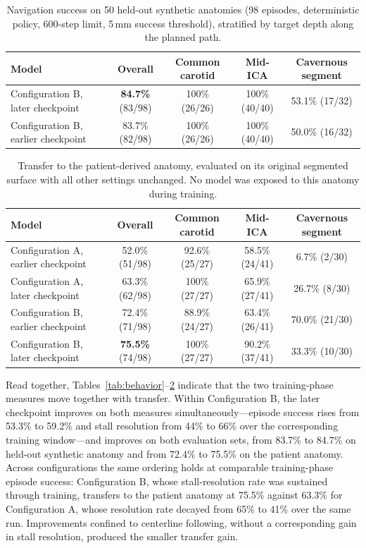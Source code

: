 \begin{table}[ht]
\caption{Navigation success on 50 held-out synthetic anatomies (98 episodes, deterministic
policy, 600-step limit, 5\,mm success threshold), stratified by target depth along the planned
path.}
\label{tab:synthetic}
\begin{center}
\begin{tabular}{lcccc}
\toprule
Model & Overall & Common carotid & Mid-ICA & Cavernous segment \\
\midrule
Configuration B, later checkpoint   & \textbf{84.7\%} (83/98) & 100\% (26/26) & 100\% (40/40) & 53.1\% (17/32) \\
Configuration B, earlier checkpoint & 83.7\% (82/98)          & 100\% (26/26) & 100\% (40/40) & 50.0\% (16/32) \\
\bottomrule
\end{tabular}
\end{center}
\end{table}

\begin{table}[ht]
\caption{Transfer to the patient-derived anatomy, evaluated on its original segmented surface
with all other settings unchanged. No model was exposed to this anatomy during training.}
\label{tab:patient}
\begin{center}
\begin{tabular}{lcccc}
\toprule
Model & Overall & Common carotid & Mid-ICA & Cavernous segment \\
\midrule
Configuration A, earlier checkpoint & 52.0\% (51/98)          & 92.6\% (25/27) & 58.5\% (24/41) & \phantom{0}6.7\% (2/30) \\
Configuration A, later checkpoint   & 63.3\% (62/98)          & 100\% (27/27)  & 65.9\% (27/41) & 26.7\% (8/30) \\
Configuration B, earlier checkpoint & 72.4\% (71/98)          & 88.9\% (24/27) & 63.4\% (26/41) & 70.0\% (21/30) \\
Configuration B, later checkpoint   & \textbf{75.5\%} (74/98) & 100\% (27/27)  & 90.2\% (37/41) & 33.3\% (10/30) \\
\bottomrule
\end{tabular}
\end{center}
\end{table}

Read together, Tables~\ref{tab:behavior}--\ref{tab:patient} indicate that the two training-phase
measures move together with transfer. Within Configuration B, the later checkpoint improves on
both measures simultaneously---episode success rises from 53.3\% to 59.2\% and stall resolution
from 44\% to 66\% over the corresponding training window---and improves on both evaluation sets,
from 83.7\% to 84.7\% on held-out synthetic anatomy and from 72.4\% to 75.5\% on the patient
anatomy. Across configurations the same ordering holds at comparable training-phase episode
success: Configuration B, whose stall-resolution rate was sustained through training, transfers
to the patient anatomy at 75.5\% against 63.3\% for Configuration A, whose resolution rate decayed
from 65\% to 41\% over the same run. Improvements confined to centerline following, without a
corresponding gain in stall resolution, produced the smaller transfer gain.

